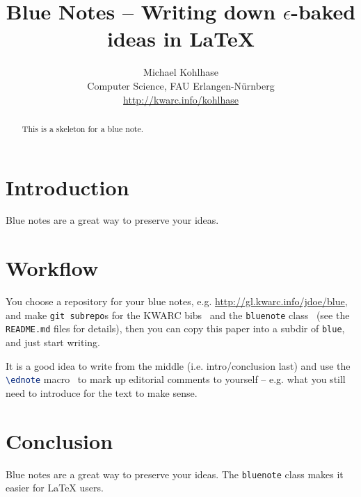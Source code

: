\documentclass{bluenote}
\title{Blue Notes -- Writing down $\epsilon$-baked ideas in {\LaTeX}}
\author{Michael Kohlhase\\
  Computer Science, FAU Erlangen-N\"urnberg\\
  \url{http://kwarc.info/kohlhase}}
\begin{document}
\maketitle
\begin{abstract}
  This is a skeleton for a blue note.
\end{abstract}

\section{Introduction}\label{sec:intro}

Blue notes are a great way to preserve your ideas. 

\section{Workflow}\label{sec:main}

You choose a repository for your blue notes, e.g. \url{http://gl.kwarc.info/jdoe/blue},
and make \lstinline|git subrepo|s for the KWARC bibs~\cite{KBibs:on} and the
\lstinline|bluenote| class~\cite{BlueNote:on} (see the \lstinline|README.md| files for
details), then you can copy this paper into a subdir of \lstinline|blue|, and just start
writing.

It is a good idea to write from the middle (i.e. intro/conclusion last) and use the
\lstinline[language=TeX]|\ednote| macro~\cite{ed:on} to mark up editorial comments to
yourself -- e.g. what you still need to introduce for the text to make sense.

\section{Conclusion}\label{sec:concl}

Blue notes are a great way to preserve your ideas. The \lstinline|bluenote| class makes it
easier for {\LaTeX} users. 

\begin{sloppypar}
\printbibliography
\end{sloppypar}
\end{document}
